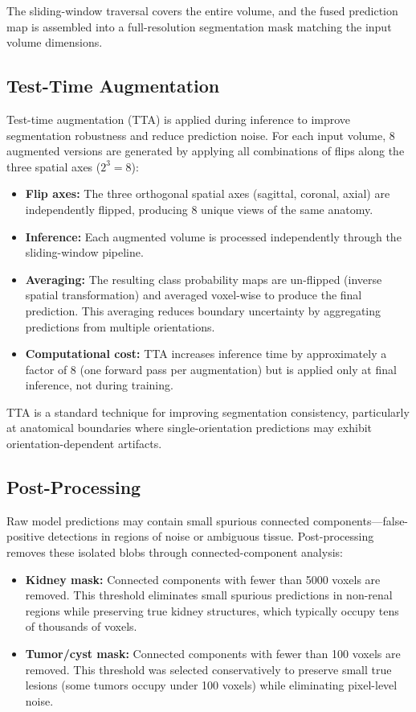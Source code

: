 The sliding-window traversal covers the entire volume, and the fused prediction map is assembled into a full-resolution segmentation mask matching the input volume dimensions.

\subsection{Test-Time Augmentation}

Test-time augmentation (TTA) is applied during inference to improve segmentation robustness and reduce prediction noise. For each input volume, 8 augmented versions are generated by applying all combinations of flips along the three spatial axes ($2^3 = 8$):

\begin{itemize}
    \item \textbf{Flip axes:} The three orthogonal spatial axes (sagittal, coronal, axial) are independently flipped, producing 8 unique views of the same anatomy.
    \item \textbf{Inference:} Each augmented volume is processed independently through the sliding-window pipeline.
    \item \textbf{Averaging:} The resulting class probability maps are un-flipped (inverse spatial transformation) and averaged voxel-wise to produce the final prediction. This averaging reduces boundary uncertainty by aggregating predictions from multiple orientations.
    \item \textbf{Computational cost:} TTA increases inference time by approximately a factor of 8 (one forward pass per augmentation) but is applied only at final inference, not during training.
\end{itemize}

TTA is a standard technique for improving segmentation consistency, particularly at anatomical boundaries where single-orientation predictions may exhibit orientation-dependent artifacts.

\subsection{Post-Processing}

Raw model predictions may contain small spurious connected components---false-positive detections in regions of noise or ambiguous tissue. Post-processing removes these isolated blobs through connected-component analysis:

\begin{itemize}
    \item \textbf{Kidney mask:} Connected components with fewer than 5000 voxels are removed. This threshold eliminates small spurious predictions in non-renal regions while preserving true kidney structures, which typically occupy tens of thousands of voxels.
    \item \textbf{Tumor/cyst mask:} Connected components with fewer than 100 voxels are removed. This threshold was selected conservatively to preserve small true lesions (some tumors occupy under 100 voxels) while eliminating pixel-level noise.
\end{itemize}

